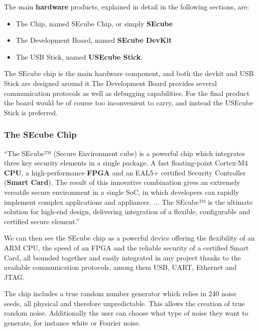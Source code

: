 \vspace{5pt}

The main \textbf{hardware} products, explained in detail in the following sections, are:
\begin{itemize}
\setlength\itemsep{0pt}
\item The Chip, named SEcube Chip, or simply \textbf{SEcube}
\item The Development Board, named \textbf{SEcube DevKit}
\item The USB Stick, named \textbf{USEcube Stick}.
\end{itemize}

The SEcube chip is the main hardware component, and both the devkit and USB Stick are designed around it.The Development Board provides several communication protocols as well as debugging capabilities. For the final product the board would be of course too inconvenient to carry, and instead the USEcube Stick is preferred.

\subsubsection{The SEcube Chip}

``The SEcube™ (Secure Environment cube) is a powerful chip which
integrates three key security elements in a single package. A fast
floating-point Cortex-M4 \textbf{CPU}, a high-performance \textbf{FPGA} and an
EAL5+ certified Security Controller (\textbf{Smart Card}).
The result of this innovative combination gives an extremely
versatile secure environment in a single SoC, in which developers
can rapidly implement complex applications and appliances.
... The SEcube™ is the ultimate solution for high-end design,
delivering integration of a flexible, configurable and certified
secure element.'' \cite{SEcubeDS}

We can then see the SEcube chip as a powerful device offering the flexibility of an \textsc{ARM} CPU, the speed of an FPGA and the reliable security of a certified Smart Card, all bounded together and easily integrated in any project thanks to the available communication protocols, among them USB, UART, Ethernet and JTAG. 

The chip includes a true random number generator which relies in 240 noise seeds, all physical and therefore unpredictable. This allows the creation of true random noise. Additionally the user can choose what type of noise they want to generate, for instance white or Fourier noise.


